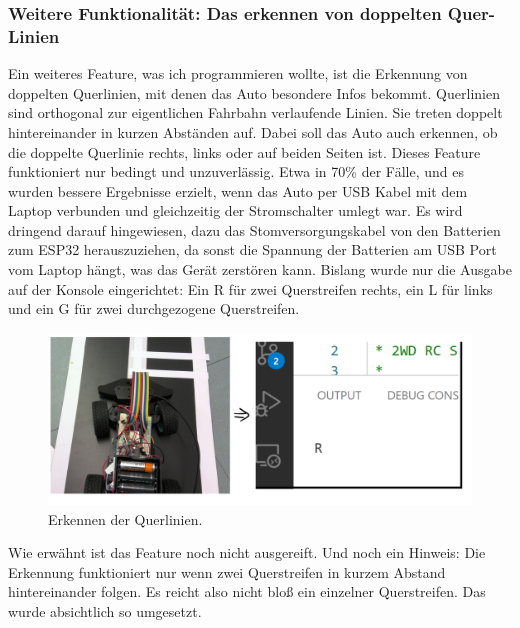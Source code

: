 	\subsubsection{Weitere Funktionalität: Das erkennen von doppelten Quer-Linien}
	Ein weiteres Feature, was ich programmieren wollte, ist die Erkennung von doppelten Querlinien, mit denen das Auto besondere Infos bekommt. Querlinien sind orthogonal zur eigentlichen Fahrbahn verlaufende Linien. Sie treten doppelt hintereinander in kurzen Abständen auf. Dabei soll das Auto auch erkennen, ob die doppelte Querlinie rechts, links oder auf beiden Seiten ist. Dieses Feature funktioniert nur bedingt und unzuverlässig. Etwa in 70\% der Fälle, und es wurden bessere Ergebnisse erzielt, wenn das Auto per USB Kabel mit dem Laptop verbunden und gleichzeitig der Stromschalter umlegt war. Es wird dringend darauf hingewiesen, dazu das Stomversorgungskabel von den Batterien zum ESP32 herauszuziehen, da sonst die Spannung der Batterien am USB Port vom Laptop hängt, was das Gerät zerstören kann. Bislang wurde nur die Ausgabe auf der Konsole eingerichtet: Ein R für zwei Querstreifen rechts, ein L für links und ein G für zwei durchgezogene Querstreifen.
	
	\begin{figure}[H]
		\centering
		\label{sensor9}
		\includegraphics[scale=0.55]{img/Sensor/Sensor9.png}
		\caption{Erkennen der Querlinien.}
	\end{figure}

	
	Wie erwähnt ist das Feature noch nicht ausgereift. Und noch ein Hinweis: Die Erkennung funktioniert nur wenn zwei Querstreifen in kurzem Abstand hintereinander folgen. Es reicht also nicht bloß ein einzelner Querstreifen. Das wurde absichtlich so umgesetzt.
	
	
